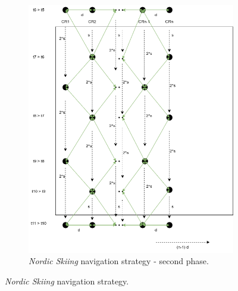 \begin{figure}[h!]
\begin{subfigure}[t]{0.45\linewidth}
		\includegraphics[width=\linewidth]{graphics/ski_nordique_2.png}
		\caption{\textit{Nordic Skiing} navigation strategy - second phase.}
		\label{fig:ski_nordique_2}
	\end{subfigure}
	\caption{\textit{Nordic Skiing} navigation strategy.}
	\label{fig:ski_nordique}
\end{figure}

